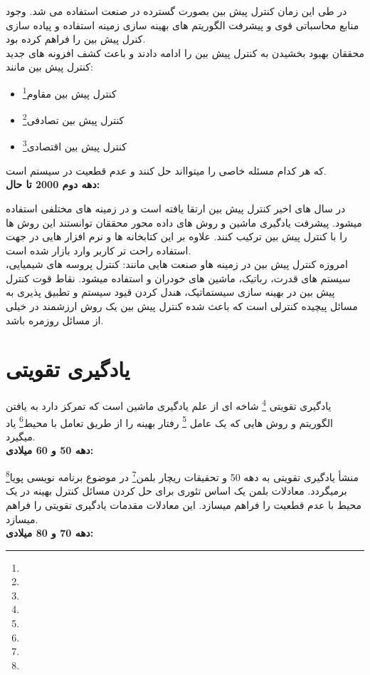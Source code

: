 \documentclass[12pt,a4paper]{report}
\begin{document}
	در طی این زمان کنترل پیش بین بصورت گسترده در صنعت استفاده می شد. وجود منابع محاسباتی قوی و پیشرفت الگوریتم های بهینه سازی زمینه استفاده و پیاده سازی کنرل پیش بین را فراهم کرده بود.\\
	محققان بهبود بخشیدن به کنترل پیش بین را ادامه دادند و باعث کشف افزونه های جدید کنترل پیش بین مانند:
	\begin{itemize}
		\item[\ding{70}]  کنترل پیش بین مقاوم\footnote{}\cite{campo1987robust}
		\item[\ding{70}]   کنترل پیش بین تصادفی\footnote{}
		\item[\ding{70}]  کنترل پیش بین اقتصادی\footnote{} 
	\end{itemize}
	که هر کدام مسئله خاصی را میتوااند حل کنند و عدم قطعیت در سیستم است.\\
	\textbf{دهه دوم 2000 تا حال:}
	
	در سال های اخیر کنترل پیش بین ارتقا یافته است و در زمینه های مختلفی استفاده میشود. پیشرفت یادگیری ماشین و روش های داده محور محققان توانستند این روش ها را با کنترل پیش بین ترکیب کنند. علاوه بر این کتابخانه ها و نرم افزار هایی در جهت استفاده راحت تر کاربر وارد بازار شده است.\\
	امروزه کنترل پیش بین در زمینه هاو صنعت هایی مانند: کنترل پروسه های شیمیایی، سیستم های قدرت، رباتیک، ماشین های خودران و \lr{\dots} استفاده میشود. نقاط قوت کنترل پیش بین در بهینه سازی سیستماتیک، هندل کردن قیود سیستم و تطبیق پذیری به مسائل پیچیده کنترلی است که باعث شده کنترل پیش بین یک روش ارزشمند در خیلی از مسائل روزمره باشد.
	
	\section{یادگیری تقویتی}
	یادگیری تقویتی \footnote{} شاخه ای از علم یادگیری ماشین است که تمرکز دارد به یافتن الگوریتم و روش هایی که یک عامل \footnote{} رفتار بهینه را از طریق تعامل با محیط\footnote{} یاد میگیرد. \\
	\textbf{دهه 50 و 60 میلادی:}
	
	منشأ یادگیری تقویتی به دهه 50 و تحقیقات ریچار بلمن\footnote{} در موضوع برنامه نویسی پویا\footnote{} \cite{Bellman:DynamicProgramming} برمیگردد. معادلات بلمن یک اساس تئوری برای حل کردن مسائل کنترل بهینه در یک محیط با عدم قطعیت را فراهم میسازد. این معادلات مقدمات یادگیری تقویتی را فراهم میسازد.\\
	\textbf{دهه 70 و 80 میلادی:}
	
\end{document}
